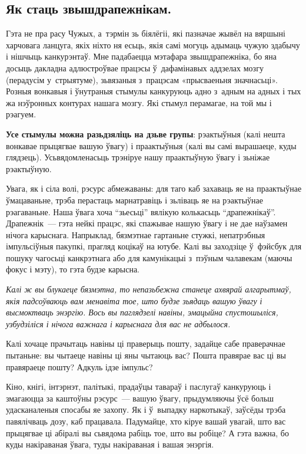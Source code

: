
\subsection*{Як стаць звышдрапежнікам.}

Гэта не пра расу Чужых, а~тэрмін зь біялёгіі, які пазначае жывёл на вяршыні харчовага ланцуга, якіх ніхто ня есьць, якія самі могуць адымаць чужую здабычу і нішчыць канкурэнтаў. Мне падабаецца мэтафара звышдрапежніка, бо яна досыць дакладна адлюстроўвае працэсы ў~дафамінавых аддзелах мозгу (перадусім у~стрыятуме), зьвязаныя з~працэсам «прысваеньня значнасьці». Розныя вонкавыя і ўнутраныя стымулы канкуруюць адно з~адным на адных і тых жа нэўронных контурах нашага мозгу. Які стымул перамагае, на той мы і рэагуем.

\textbf{Усе стымулы можна разьдзяліць на дзьве групы}: рэактыўныя (калі нешта вонкавае прыцягвае вашую ўвагу) і праактыўныя (калі вы самі вырашаеце, куды глядзець). Усьвядомленасьць трэніруе нашу праактыўную ўвагу і зьніжае рэактыўную.

Увага, як і сіла волі, рэсурс абмежаваны: для таго каб захаваць яе на праактыўнае ўмацаваньне, трэба перастаць марнатравіць і зьліваць яе на рэактыўнае рэагаваньне. Наша ўвага хоча ``зьесьці'' вялікую колькасьць ``драпежнікаў''. Драпежнік~--- гэта нейкі працэс, які спажывае нашую ўвагу і не дае наўзамен нічога карыснага. Напрыклад, бязмэтнае гартаньне стужкі, непатрэбныя імпульсіўныя пакупкі, прагляд коцікаў на ютубе. Калі вы заходзіце ў~фэйсбук для пошуку чагосьці канкрэтнага або для камунікацыі з~пэўным чалавекам (маючы фокус і мэту), то гэта будзе карысна.

\emph{Калі ж вы блукаеце бязмэтна, то непазьбежна станеце ахвярай алгарытмаў, якія падсоўваюць вам менавіта тое, што будзе зьядаць вашую ўвагу і высмоктваць энэргію. Вось вы паглядзелі навіны, эмацыйна спустошыліся, узбудзіліся і нічога важнага і карыснага для вас не адбылося.}

Калі хочаце прачытаць навіны ці праверыць пошту, задайце сабе праверачнае пытаньне: вы чытаеце навіны ці яны чытаюць вас? Пошта правярае вас ці вы правяраеце пошту? Адкуль ідзе імпульс?

Кіно, кнігі, інтэрнэт, палітыкі, прадаўцы тавараў і паслугаў канкуруюць і змагаюцца за каштоўны рэсурс~--- вашую ўвагу, прыдумляючы ўсё больш удасканаленыя спосабы яе захопу. Як і ў~выпадку наркотыкаў, заўсёды трэба павялічваць дозу, каб працавала. Падумайце, хто кіруе вашай увагай, што вас прыцягвае ці абіралі вы сьвядома рабіць тое, што вы робіце? А гэта важна, бо куды накіраваная ўвага, туды накіраваная і вашая энэргія.

